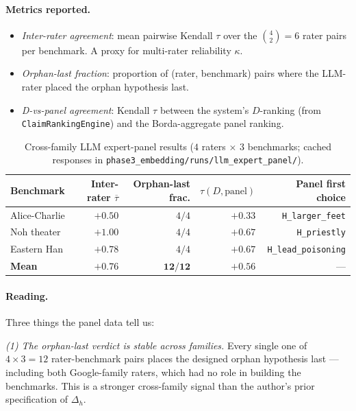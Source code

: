 \documentclass{article}
\begin{document}
\paragraph{Metrics reported.}
\begin{itemize}[leftmargin=*, itemsep=0pt]
\item \emph{Inter-rater agreement}: mean pairwise Kendall $\tau$
over the $\binom{4}{2} = 6$ rater pairs per benchmark. A proxy for
multi-rater reliability $\kappa$.
\item \emph{Orphan-last fraction}: proportion of (rater, benchmark)
pairs where the LLM-rater placed the orphan hypothesis last.
\item \emph{D-vs-panel agreement}: Kendall $\tau$ between the
system's $D$-ranking (from \texttt{ClaimRankingEngine}) and the
Borda-aggregate panel ranking.
\end{itemize}

\begin{table}[h]
\centering
\caption{Cross-family LLM expert-panel results
($4$ raters $\times$ $3$ benchmarks; cached responses in
\texttt{phase3\_embedding/runs/llm\_expert\_panel/}).}
\label{tab:llm-panel}
\small
\begin{tabular}{lrrrr}
\toprule
Benchmark & Inter-rater $\overline{\tau}$ & Orphan-last frac. & $\tau(D, \text{panel})$ & Panel first choice \\
\midrule
Alice-Charlie  & $+0.50$ & $4/4$ & $+0.33$ & \texttt{H\_larger\_feet} \\
Noh theater    & $+1.00$ & $4/4$ & $+0.67$ & \texttt{H\_priestly} \\
Eastern Han    & $+0.78$ & $4/4$ & $+0.67$ & \texttt{H\_lead\_poisoning} \\
\midrule
\textbf{Mean}  & $\mathbf{+0.76}$ & $\mathbf{12/12}$ & $\mathbf{+0.56}$ & --- \\
\bottomrule
\end{tabular}
\end{table}

\paragraph{Reading.} Three things the panel data tell us:

\emph{(1) The orphan-last verdict is stable across families.} Every
single one of $4 \times 3 = 12$ rater-benchmark pairs places the
designed orphan hypothesis last --- including both Google-family
raters, which had no role in building the benchmarks. This is a
stronger cross-family signal than the author's prior specification
of $\Delta_{h}$.
\end{document}
